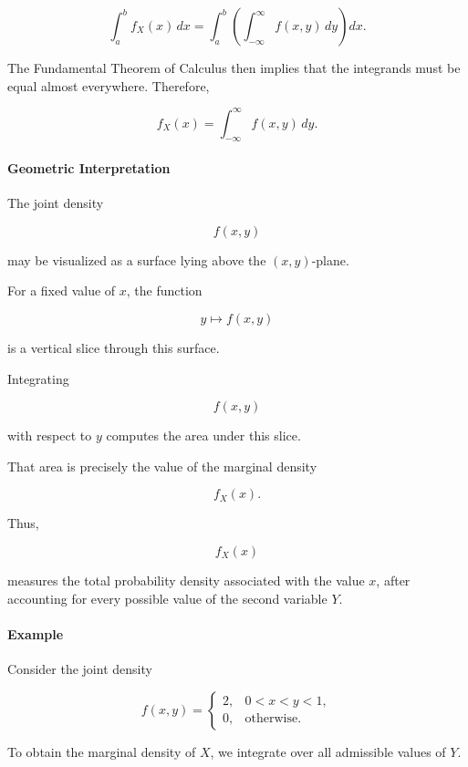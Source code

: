 \documentclass[11pt]{article}
\begin{document}
\begin{mdframed}[
		linewidth=0.8pt,
		roundcorner=6pt,
		backgroundcolor=gray!5,
		linecolor=gray!60,
		innertopmargin=10pt,
		innerbottommargin=10pt,
		innerleftmargin=10pt,
		innerrightmargin=10pt
		]
		\[
		\int_a^b
		f_X(x)\,dx
		=
		\int_a^b
		\left(
		\int_{-\infty}^{\infty}
		f(x,y)\,dy
		\right)
		dx.
		\]
		
		The Fundamental Theorem of Calculus then implies that the integrands must be
		equal almost everywhere. Therefore,
		
		\[
		\boxed{
			f_X(x)
			=
			\int_{-\infty}^{\infty}
			f(x,y)\,dy.
		}
		\]
		
		\bigskip
		
		\paragraph{Geometric Interpretation}
		
		The joint density
		
		\[
		f(x,y)
		\]
		
		may be visualized as a surface lying above the \((x,y)\)-plane.
		
		For a fixed value of \(x\), the function
		
		\[
		y\mapsto f(x,y)
		\]
		
		is a vertical slice through this surface.
		
		Integrating
		
		\[
		f(x,y)
		\]
		
		with respect to \(y\) computes the area under this slice.
		
		That area is precisely the value of the marginal density
		
		\[
		f_X(x).
		\]
		
		Thus,
		
		\[
		f_X(x)
		\]
		
		measures the total probability density associated with the value \(x\),
		after accounting for every possible value of the second variable \(Y\).
		
		\bigskip
		
		\paragraph{Example}
		
		Consider the joint density
		
		\[
		f(x,y)
		=
		\begin{cases}
			2,
			&
			0<x<y<1,
			\\[0.2cm]
			0,
			&
			\text{otherwise.}
		\end{cases}
		\]
		
		To obtain the marginal density of \(X\), we integrate over all admissible
		values of \(Y\).
		

\end{mdframed}
\end{document}
